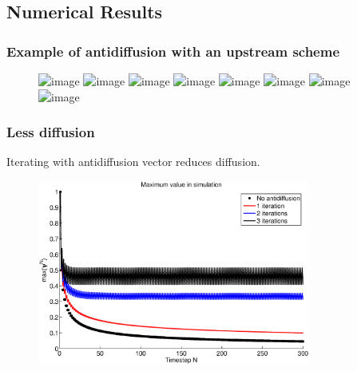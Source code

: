 \documentclass[hyperref={pdfstartview=Fit}]{beamer}
\newcommand{\imsize}{}
\begin{document}
\subsection{Numerical Results}

\begin{frame}
\frametitle{Example of antidiffusion with an upstream scheme}
\begin{figure}
\renewcommand{\imsize}{0.7\textwidth}
\includegraphics<1>[width=\imsize]{animation/aanime0}%
\includegraphics<2>[width=\imsize]{animation/aanime1}%
\includegraphics<3>[width=\imsize]{animation/aanime2}%
\includegraphics<4>[width=\imsize]{animation/aanime3}%
\includegraphics<5>[width=\imsize]{animation/aanime4}%
\includegraphics<6>[width=\imsize]{animation/aanime5}%
\includegraphics<7>[width=\imsize]{animation/aanime6}%
\includegraphics<8>[width=\imsize]{animation/aanime7}%
\end{figure}
\end{frame}

\begin{frame}

\frametitle{Less diffusion}
Iterating with antidiffusion vector reduces diffusion.

\begin{figure}
\renewcommand{\imsize}{0.8\textwidth}
\includegraphics[width=\imsize]{maxs}%
\end{figure}
\end{frame}
\end{document}
